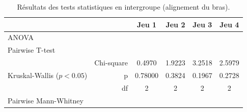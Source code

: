 \begin{table}[]
\begin{tabular}{lr|cccc}
&  & Jeu 1 & Jeu 2 & Jeu 3 & Jeu 4 \\\hline
\multirow{2}{*}{ANOVA} &  &  &  &  &  \\
 &  &  &  &  &  \\\hline
\multirow{3}{*}{Pairwise T-test} & & & & & \\
 & & & & &  \\
 & & & & &  \\\hline
\multirow{3}{*}{Kruskal-Wallis ($p < 0.05$)} & Chi-square & 0.4970 & 1.9223 & 3.2518 & 2.5979 \\
 & p & 0.78000 & 0.3824 & 0.1967 & 0.2728 \\
 & df & 2 & 2 & 2 & 2 \\\hline
 \multirow{3}{*}{Pairwise Mann-Whitney} & & & & & \\
 & & & & & \\
 & & & & &
\end{tabular}
\caption{Résultats des tests statistiques en intergroupe (alignement du bras).}
\label{tab:align_arm_inter}
\end{table}

